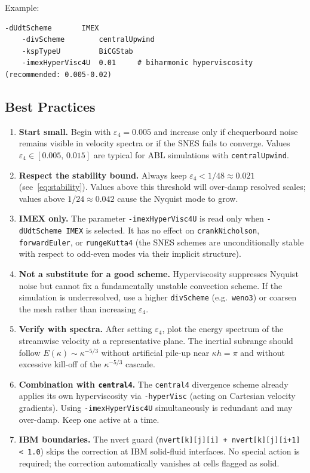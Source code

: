 \documentclass[12pt,a4paper]{article}
\begin{document}
	Example:
	\begin{lstlisting}[language={},style=cstyle]
	-dUdtScheme       IMEX
	-divScheme        centralUpwind
	-kspTypeU         BiCGStab
	-imexHyperVisc4U  0.01     # biharmonic hyperviscosity (recommended: 0.005-0.02)
	\end{lstlisting}

	\subsection{Best Practices}
	\label{sec:hypervisc:bestpractices}

	\begin{enumerate}
		\item \textbf{Start small.} Begin with $\varepsilon_4 = 0.005$ and
		increase only if chequerboard noise remains visible in velocity
		spectra or if the SNES fails to converge. Values
		$\varepsilon_4 \in [0.005,\,0.015]$ are typical for ABL simulations
		with \texttt{centralUpwind}.

		\item \textbf{Respect the stability bound.} Always keep
		$\varepsilon_4 < 1/48 \approx 0.021$ (see~\eqref{eq:stability}).
		Values above this threshold will over-damp resolved scales;
		values above $1/24 \approx 0.042$ cause the Nyquist mode to grow.

		\item \textbf{IMEX only.} The parameter \texttt{-imexHyperVisc4U}
		is read only when \texttt{-dUdtScheme IMEX} is selected.
		It has no effect on \texttt{crankNicholson}, \texttt{forwardEuler},
		or \texttt{rungeKutta4} (the SNES schemes are unconditionally stable
		with respect to odd-even modes via their implicit structure).

		\item \textbf{Not a substitute for a good scheme.} Hyperviscosity
		suppresses Nyquist noise but cannot fix a fundamentally unstable
		convection scheme. If the simulation is underresolved, use a higher
		\texttt{divScheme} (e.g.\ \texttt{weno3}) or coarsen the mesh
		rather than increasing $\varepsilon_4$.

		\item \textbf{Verify with spectra.} After setting $\varepsilon_4$,
		plot the energy spectrum of the streamwise velocity at a representative
		plane. The inertial subrange should follow $E(\kappa) \sim \kappa^{-5/3}$
		without artificial pile-up near $\kappa h = \pi$ and without excessive
		kill-off of the $\kappa^{-5/3}$ cascade.

		\item \textbf{Combination with \texttt{central4}.} The
		\texttt{central4} divergence scheme already applies its own
		hyperviscosity via \texttt{-hyperVisc} (acting on Cartesian velocity
		gradients). Using \texttt{-imexHyperVisc4U} simultaneously is
		redundant and may over-damp. Keep one active at a time.

		\item \textbf{IBM boundaries.} The nvert guard
		(\texttt{nvert[k][j][i] + nvert[k][j][i+1] < 1.0}) skips the
		correction at IBM solid-fluid interfaces. No special action is
		required; the correction automatically vanishes at cells flagged
		as solid.
	\end{enumerate}
\end{document}
